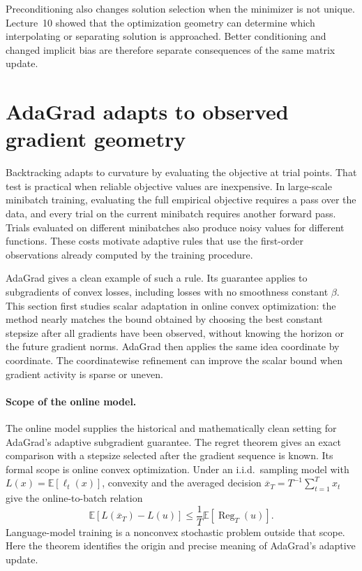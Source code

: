 \documentclass[11pt,twoside]{article}
\newcommand{\E}{\mathbb E}
\theoremstyle{definition}
\theoremstyle{remark}
\begin{document}
Preconditioning also changes solution selection when the minimizer is not
unique. Lecture~10 showed that the optimization geometry can determine which
interpolating or separating solution is approached. Better conditioning and
changed implicit bias are therefore separate consequences of the same matrix
update.

\section{AdaGrad adapts to observed gradient geometry}
\label{sec:adagrad}

Backtracking adapts to curvature by evaluating the objective at trial points.
That test is practical when reliable objective values are inexpensive. In
large-scale minibatch training, evaluating the full empirical objective
requires a pass over the data, and every trial on the current minibatch
requires another forward pass. Trials evaluated on different minibatches also
produce noisy values for different functions. These costs motivate adaptive
rules that use the first-order observations already computed by the training
procedure.

AdaGrad gives a clean example of such a rule. Its guarantee applies to
subgradients of convex losses, including losses with no smoothness constant
$\beta$. This section first studies scalar adaptation in online convex
optimization: the method nearly matches the bound obtained by choosing the
best constant stepsize after all gradients have been observed, without
knowing the horizon or the future gradient norms. AdaGrad then applies the
same idea coordinate by coordinate. The coordinatewise refinement can improve
the scalar bound when gradient activity is sparse or uneven.

\paragraph{Scope of the online model.}
The online model supplies the historical and mathematically clean setting for
AdaGrad's adaptive subgradient guarantee. The regret theorem gives an exact
comparison with a stepsize selected after the gradient sequence is known.
Its formal scope is online convex optimization. Under an i.i.d.\ sampling
model with $L(x)=\E[\ell_t(x)]$, convexity and the averaged decision
$\overline x_T=T^{-1}\sum_{t=1}^T x_t$ give the online-to-batch relation
\begin{equation}
 \E[L(\overline x_T)-L(u)]
 \le\frac1T\E[\operatorname{Reg}_T(u)].
 \label{eq:online-to-batch}
\end{equation}
Language-model training is a nonconvex stochastic problem outside that scope.
Here the theorem identifies the origin and precise meaning of AdaGrad's
adaptive update.
\end{document}
